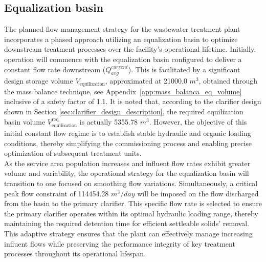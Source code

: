 \documentclass[11pt]{article}
\begin{document}
\subsection{Equalization basin}
\label{sec:equalization_basin}



The planned flow management strategy for the wastewater 
treatment plant incorporates a phased approach utilizing 
an equalization basin to optimize downstream treatment 
processes over the facility's operational lifetime. Initially, 
operation will commence with the equalization basin 
configured to deliver a constant flow rate downstream ($Q_{avg}^{current}$). 
This is facilitated by a significant design storage volume $V_{\text{equilization}}$, 
approximated at 
21000.0
$m^3$, obtained through the mass balance 
technique, see Appendix~\ref{app:mass_balanca_eq_volume} inclusive of a safety factor of 
1.1. It is noted that, according to the clarifier design 
shown in Section \ref{sec:clarifier_design_description}, the required 
equilization basin volume $V_{\text{equilization}}^{\text{req}}$ is actually 
5355.78
$m^3$. However, the objective of this initial constant flow regime is 
to establish stable hydraulic and organic loading 
conditions, thereby simplifying the commissioning process 
and enabling precise optimization of subsequent treatment units.\\

 As the service area population increases and influent 
 flow rates exhibit greater volume and variability, 
 the operational strategy for the equalization basin 
 will transition to one focused on smoothing flow variations. 
 Simultaneously, a critical peak flow constraint of 
114454.28
 $m^3/day$ will be imposed on the flow discharged from the 
 basin to the primary clarifier. This specific 
 flow rate is selected to ensure the primary 
 clarifier operates within its optimal hydraulic 
 loading range, thereby maintaining the required 
 detention time for efficient settleable solids' removal. 
 This adaptive strategy ensures that the plant can 
 effectively manage increasing influent flows while 
 preserving the performance integrity of key 
 treatment processes throughout its operational lifespan.\\
\end{document}
